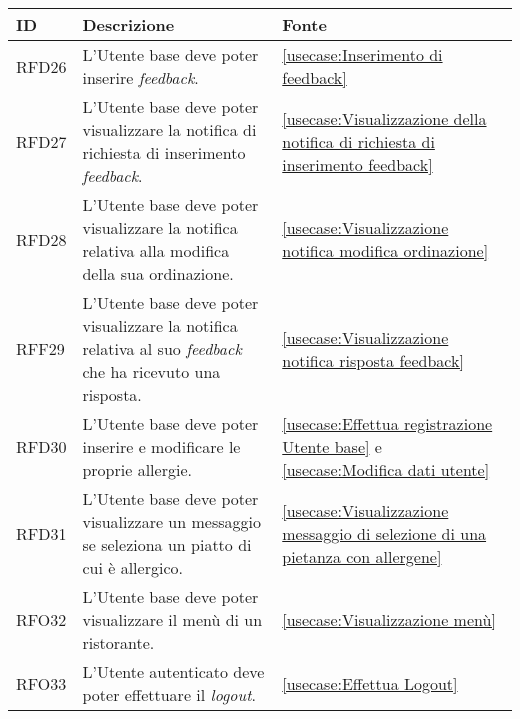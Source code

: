 \begin{table}[H]
	\renewcommand{\arraystretch}{1.5}
	\centering
	\begin{tabularx}{\textwidth}{l|X|p{2cm}}
		\textbf{ID} & \textbf{Descrizione}                                                                                                 & \textbf{Fonte}                                                                                \\
		\hline
		RFD26       & L'Utente base deve poter inserire \textit{feedback}.                                                                 & \autoref{usecase:Inserimento di feedback}                                                     \\
		\hline
		RFD27       & L'Utente base deve poter visualizzare la notifica di richiesta di inserimento \textit{feedback}.                     & \autoref{usecase:Visualizzazione della notifica di richiesta di inserimento feedback}         \\
		\hline
		RFD28       & L'Utente base deve poter visualizzare la notifica relativa alla modifica della sua ordinazione.                      & \autoref{usecase:Visualizzazione notifica modifica ordinazione}                               \\
		\hline
		RFF29       & L'Utente base deve poter visualizzare la notifica relativa al suo \textit{feedback} che ha ricevuto una risposta.    & \autoref{usecase:Visualizzazione notifica risposta feedback}                                  \\
		\hline
		RFD30       & L'Utente base deve poter inserire e modificare le proprie allergie.                                                  & \autoref{usecase:Effettua registrazione Utente base} e \autoref{usecase:Modifica dati utente} \\
		\hline
		RFD31       & L'Utente base deve poter visualizzare un messaggio se seleziona un piatto di cui è allergico.                        & \autoref{usecase:Visualizzazione messaggio di selezione di una pietanza con allergene}        \\
		\hline
		RFO32       & L'Utente base deve poter visualizzare il menù di un ristorante.                                                      & \autoref{usecase:Visualizzazione menù}                                                        \\
		\hline
		RFO33       & L'Utente autenticato deve poter effettuare il \textit{logout}.                                                       & \autoref{usecase:Effettua Logout}                                                             \\

\end{tabularx}
\end{table}
